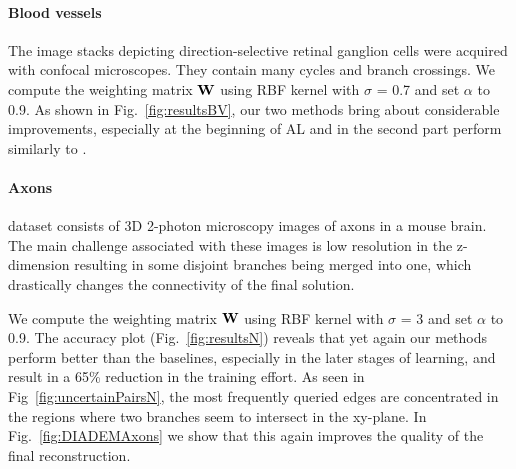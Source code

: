 \documentclass[10pt,twocolumn,letterpaper]{article}
\begin{document}
\paragraph{Blood vessels}
The image stacks depicting direction-selective retinal ganglion cells were acquired with confocal microscopes. They contain many cycles and branch crossings. We compute the weighting matrix $\mathbf{W}$ using RBF kernel with $\sigma$ = 0.7 and set $\alpha$ to 0.9. As shown in Fig.~\ref{fig:resultsBV}, our two methods bring about considerable improvements, especially at the beginning of AL and in the second part perform similarly to \QBC{}. 

\paragraph{Axons}
dataset consists of 3D 2-photon microscopy images of axons in a mouse brain. The main challenge associated with these images is low resolution in the z-dimension resulting in some disjoint branches being merged into one, which drastically changes the connectivity of the final solution. 

We compute the weighting matrix $\mathbf{W}$ using RBF kernel with $\sigma$ = 3 and set $\alpha$ to 0.9. The accuracy plot (Fig.~\ref{fig:resultsN}) reveals that yet again our methods perform better than the baselines, especially in the later stages of learning, and result in a 65\% reduction in the training effort. As seen in Fig~\ref{fig:uncertainPairsN}, the most frequently queried edges are concentrated in the regions where two branches seem to intersect in the xy-plane. In Fig.~\ref{fig:DIADEMAxons} we show that this again improves the quality of the final reconstruction.
\end{document}
